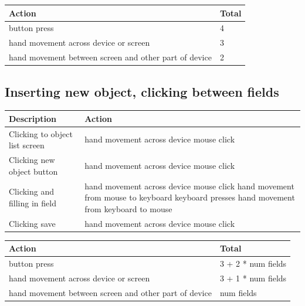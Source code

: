 \documentclass[12pt, letter]{article}
\begin{document}
\vspace{.25cm}

\begin{tabular}[H]{|p{10cm}|p{2cm}|}
\hline
Action & Total \\
\hline
button press & 4 \\
hand movement across device or screen & 3 \\
hand movement between screen and other part of device & 2 \\
\hline
\end{tabular}

\subsection{Inserting new object, clicking between fields}

\begin{tabular}[H]{|p{5cm} | p{10cm}|}
\hline
Description & Action \\
\hline
Clicking to object list screen & hand movement across device \newline mouse click \\
Clicking new object button & hand movement across device \newline mouse click \\
Clicking and filling in field &  hand movement across device \newline mouse click \newline hand movement from mouse to keyboard \newline keyboard presses \newline hand movement from keyboard to mouse   \\
Clicking save & hand movement across device \newline mouse click \\
\hline
\end{tabular}

\vspace{.25cm}

\begin{tabular}[H]{|p{10cm}|p{2cm}|}
\hline
Action & Total \\
\hline
button press & 3 + 2 * num fields\\
hand movement across device or screen & 3 + 1 * num fields\\
hand movement between screen and other part of device & num fields\\
\hline
\end{tabular}
\end{document}
